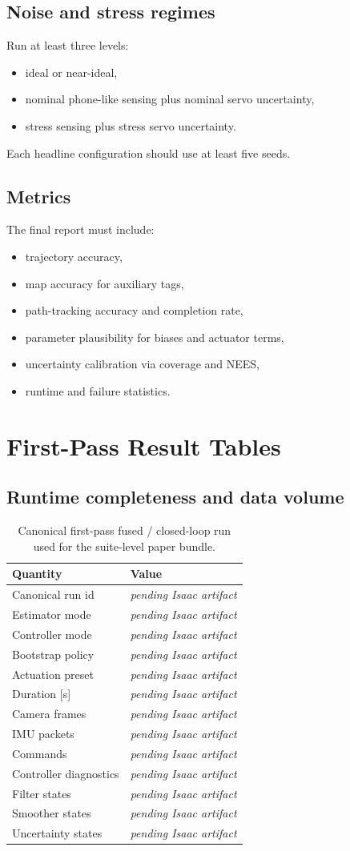 \documentclass[11pt]{article}
\newcommand{\ArtifactPending}{\textit{pending Isaac artifact}}
\newcommand{\IsaacFirstPassCompletenessRows}{%
Canonical run id & \ArtifactPending{} \\
Estimator mode & \ArtifactPending{} \\
Controller mode & \ArtifactPending{} \\
Bootstrap policy & \ArtifactPending{} \\
Actuation preset & \ArtifactPending{} \\
Duration [s] & \ArtifactPending{} \\
Camera frames & \ArtifactPending{} \\
IMU packets & \ArtifactPending{} \\
Commands & \ArtifactPending{} \\
Controller diagnostics & \ArtifactPending{} \\
Filter states & \ArtifactPending{} \\
Smoother states & \ArtifactPending{} \\
Uncertainty states & \ArtifactPending{} \\
}
\begin{document}
\subsection{Noise and stress regimes}
Run at least three levels:
\begin{itemize}[leftmargin=1.5em]
    \item ideal or near-ideal,
    \item nominal phone-like sensing plus nominal servo uncertainty,
    \item stress sensing plus stress servo uncertainty.
\end{itemize}
Each headline configuration should use at least five seeds.

\subsection{Metrics}
The final report must include:
\begin{itemize}[leftmargin=1.5em]
    \item trajectory accuracy,
    \item map accuracy for auxiliary tags,
    \item path-tracking accuracy and completion rate,
    \item parameter plausibility for biases and actuator terms,
    \item uncertainty calibration via coverage and NEES,
    \item runtime and failure statistics.
\end{itemize}

\section{First-Pass Result Tables}
\subsection{Runtime completeness and data volume}
\begin{table}[H]
\centering
\caption{Canonical first-pass fused / closed-loop run used for the suite-level paper bundle.}
\begin{tabular}{ll}
\toprule
Quantity & Value \\
\midrule
\IsaacFirstPassCompletenessRows
\bottomrule
\end{tabular}
\end{table}
\end{document}
